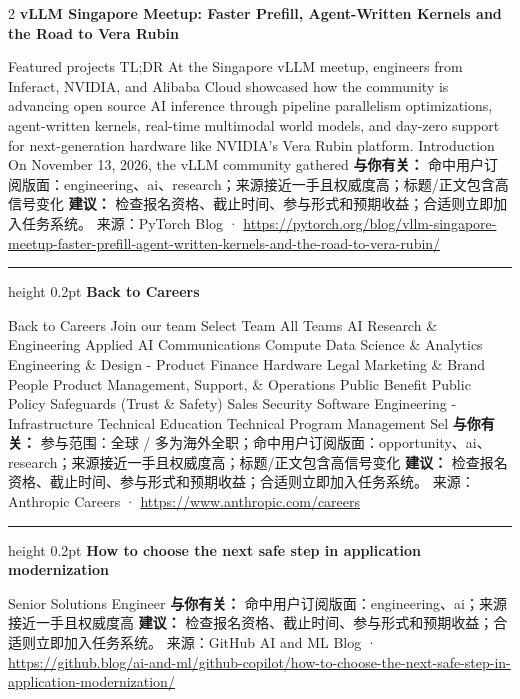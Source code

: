 \documentclass[10.5pt]{ctexart}
\begin{document}
\begin{multicols}{2}
{\large\bfseries vLLM Singapore Meetup: Faster Prefill, Agent-Written Kernels and the Road to Vera Rubin}\par
Featured projects TL;DR At the Singapore vLLM meetup, engineers from Inferact, NVIDIA, and Alibaba Cloud showcased how the community is advancing open source AI inference through pipeline parallelism optimizations, agent-written kernels, real-time multimodal world models, and day-zero support for next-generation hardware like NVIDIA’s Vera Rubin platform. Introduction On November 13, 2026, the vLLM community gathered
\textbf{与你有关：} 命中用户订阅版面：engineering、ai、research；来源接近一手且权威度高；标题/正文包含高信号变化
\textbf{建议：} 检查报名资格、截止时间、参与形式和预期收益；合适则立即加入任务系统。
{\footnotesize\color{ormuted} 来源：PyTorch Blog · \url{https://pytorch.org/blog/vllm-singapore-meetup-faster-prefill-agent-written-kernels-and-the-road-to-vera-rubin/}}
\vspace{2mm}
\hrule height 0.2pt
\vspace{2mm}
{\large\bfseries Back to Careers}\par
Back to Careers Join our team Select Team All Teams AI Research \& Engineering Applied AI Communications Compute Data Science \& Analytics Engineering \& Design - Product Finance Hardware Legal Marketing \& Brand People Product Management, Support, \& Operations Public Benefit Public Policy Safeguards (Trust \& Safety) Sales Security Software Engineering - Infrastructure Technical Education Technical Program Management Sel
\textbf{与你有关：} 参与范围：全球 / 多为海外全职；命中用户订阅版面：opportunity、ai、research；来源接近一手且权威度高；标题/正文包含高信号变化
\textbf{建议：} 检查报名资格、截止时间、参与形式和预期收益；合适则立即加入任务系统。
{\footnotesize\color{ormuted} 来源：Anthropic Careers · \url{https://www.anthropic.com/careers}}
\vspace{2mm}
\hrule height 0.2pt
\vspace{2mm}
{\large\bfseries How to choose the next safe step in application modernization}\par
Senior Solutions Engineer
\textbf{与你有关：} 命中用户订阅版面：engineering、ai；来源接近一手且权威度高
\textbf{建议：} 检查报名资格、截止时间、参与形式和预期收益；合适则立即加入任务系统。
{\footnotesize\color{ormuted} 来源：GitHub AI and ML Blog · \url{https://github.blog/ai-and-ml/github-copilot/how-to-choose-the-next-safe-step-in-application-modernization/}}
\vspace{2mm}

\end{multicols}
\end{document}

